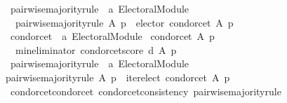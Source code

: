 \begin{isabellebody}
%
\isadelimdocument
%
\endisadelimdocument
{}\isamarkupfalse%
\ pairwise{\isacharunderscore}{\kern0pt}majority{\isacharunderscore}{\kern0pt}rule\ {\isacharcolon}{\kern0pt}{\isacharcolon}{\kern0pt}\ {\isachardoublequoteopen}{\isacharprime}{\kern0pt}a\ Electoral{\isacharunderscore}{\kern0pt}Module{\isachardoublequoteclose}\ \isanewline
\ \ {\isachardoublequoteopen}pairwise{\isacharunderscore}{\kern0pt}majority{\isacharunderscore}{\kern0pt}rule\ A\ p\ {\isacharequal}{\kern0pt}\ elector\ condorcet\ A\ p{\isachardoublequoteclose}\isanewline
\isanewline
{}\isamarkupfalse%
\ condorcet{\isacharprime}{\kern0pt}\ {\isacharcolon}{\kern0pt}{\isacharcolon}{\kern0pt}\ {\isachardoublequoteopen}{\isacharprime}{\kern0pt}a\ Electoral{\isacharunderscore}{\kern0pt}Module{\isachardoublequoteclose}\ \isanewline
{\isachardoublequoteopen}condorcet{\isacharprime}{\kern0pt}\ A\ p\ {\isacharequal}{\kern0pt}\isanewline
\ \ {\isacharparenleft}{\kern0pt}{\isacharparenleft}{\kern0pt}min{\isacharunderscore}{\kern0pt}eliminator\ condorcet{\isacharunderscore}{\kern0pt}score{\isacharparenright}{\kern0pt}\ {\isasymcirclearrowleft}\isactrlsub {\isasymexists}\isactrlsub {\isacharbang}{\kern0pt}\isactrlsub d{\isacharparenright}{\kern0pt}\ A\ p{\isachardoublequoteclose}\isanewline
\isanewline
{}\isamarkupfalse%
\ pairwise{\isacharunderscore}{\kern0pt}majority{\isacharunderscore}{\kern0pt}rule{\isacharprime}{\kern0pt}\ {\isacharcolon}{\kern0pt}{\isacharcolon}{\kern0pt}\ {\isachardoublequoteopen}{\isacharprime}{\kern0pt}a\ Electoral{\isacharunderscore}{\kern0pt}Module{\isachardoublequoteclose}\ \isanewline
{\isachardoublequoteopen}pairwise{\isacharunderscore}{\kern0pt}majority{\isacharunderscore}{\kern0pt}rule{\isacharprime}{\kern0pt}\ A\ p\ {\isacharequal}{\kern0pt}\ iterelect\ condorcet{\isacharprime}{\kern0pt}\ A\ p{\isachardoublequoteclose}%
\isadelimdocument
%
\endisadelimdocument
%
\isatagdocument
%
\isamarkuptrue%
%
\endisatagdocument
{\isafolddocument}%
%
\isadelimdocument
%
\endisadelimdocument
{}\isamarkupfalse%
\ condorcet{\isacharunderscore}{\kern0pt}condorcet{\isacharcolon}{\kern0pt}\ {\isachardoublequoteopen}condorcet{\isacharunderscore}{\kern0pt}consistency\ pairwise{\isacharunderscore}{\kern0pt}majority{\isacharunderscore}{\kern0pt}rule{\isachardoublequoteclose}\isanewline
%
\isadelimproof
%
\endisadelimproof
%
\isatagproof
{}\isamarkupfalse%
\ {\isacharminus}{\kern0pt}\isanewline
\ \ \isamarkupfalse%

\end{isabellebody}
